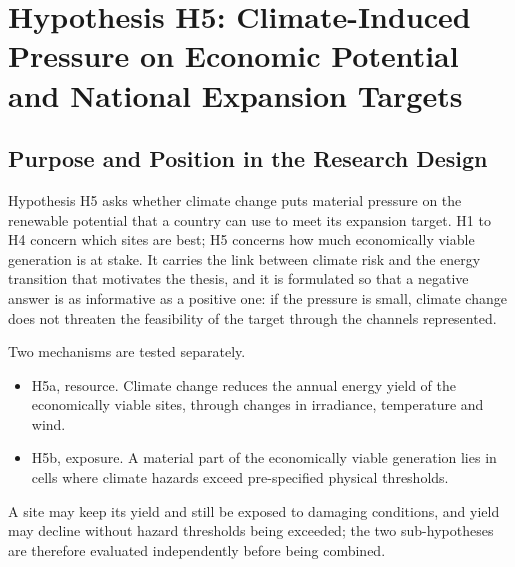 
\section{Hypothesis H5: Climate-Induced Pressure on Economic Potential and
National Expansion Targets}
\label{sec:h5}

\subsection{Purpose and Position in the Research Design}
\label{subsec:h5_purpose}

Hypothesis H5 asks whether climate change puts material pressure on the
renewable potential that a country can use to meet its expansion target. H1 to
H4 concern which sites are best; H5 concerns how much economically viable
generation is at stake. It carries the link between climate risk and the energy
transition that motivates the thesis, and it is formulated so that a negative
answer is as informative as a positive one: if the pressure is small, climate
change does not threaten the feasibility of the target through the channels
represented.

Two mechanisms are tested separately.
\begin{itemize}
    \item H5a, resource. Climate change reduces the annual energy yield of the
    economically viable sites, through changes in irradiance, temperature and
    wind.
    \item H5b, exposure. A material part of the economically viable generation
    lies in cells where climate hazards exceed pre-specified physical
    thresholds.
\end{itemize}
A site may keep its yield and still be exposed to damaging conditions, and yield
may decline without hazard thresholds being exceeded; the two sub-hypotheses are
therefore evaluated independently before being combined.

